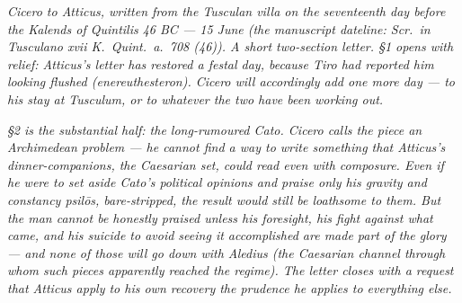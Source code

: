 
\textit{Cicero to Atticus, written from the Tusculan villa
on the seventeenth day before the Kalends of Quintilis 46 BC
--- 15 June (the manuscript dateline: \textit{Scr.\ in
Tusculano xvii K.\ Quint.\ a.\ 708 (46)}). A short two-section
letter. \S1 opens with relief: Atticus's letter has restored
a festal day, because Tiro had reported him looking flushed
(\textit{enereuthesteron}). Cicero will accordingly add one
more day --- to his stay at Tusculum, or to whatever the two
have been working out.}

\textit{\S2 is the substantial half: the long-rumoured
\textit{Cato}. Cicero calls the piece an Archimedean problem
--- he cannot find a way to write something that Atticus's
dinner-companions, the Caesarian set, could read even with
composure. Even if he were to set aside Cato's political
opinions and praise only his gravity and constancy
\textit{psil\=os}, bare-stripped, the result would still be
loathsome to them. But the man cannot be honestly praised
unless his foresight, his fight against what came, and his
suicide to avoid seeing it accomplished are made part of the
glory --- and none of those will go down with Aledius (the
Caesarian channel through whom such pieces apparently
reached the regime). The letter closes with a request that
Atticus apply to his own recovery the prudence he applies to
everything else.}
